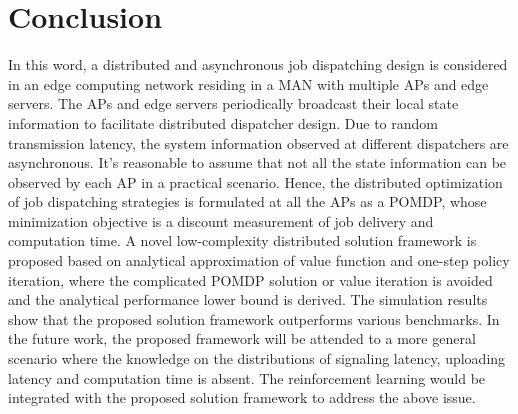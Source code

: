 \section{Conclusion}
\label{sec:conclusion}
In this word, a distributed and asynchronous job dispatching design is considered in an edge computing network residing in a MAN with multiple APs and edge servers.
The APs and edge servers periodically broadcast their local state information to facilitate distributed dispatcher design.
Due to random transmission latency, the system information observed at different dispatchers are asynchronous.
It's reasonable to assume that not all the state information can be observed by each AP in a practical scenario.
Hence, the distributed optimization of job dispatching strategies is formulated at all the APs as a POMDP, whose minimization objective is a discount measurement of job delivery and computation time.
A novel low-complexity distributed solution framework is proposed based on analytical approximation of value function and one-step policy iteration, where the complicated POMDP solution or value iteration is avoided and the analytical performance lower bound is derived.
The simulation results show that the proposed solution framework outperforms various benchmarks.
In the future work, the proposed framework will be attended to a more general scenario where the knowledge on the distributions of signaling latency, uploading latency and computation time is absent.
The reinforcement learning would be integrated with the proposed solution framework to address the above issue.